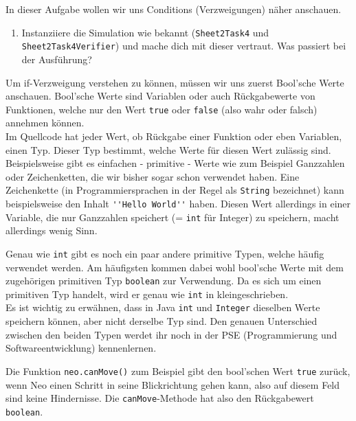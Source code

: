 

In dieser Aufgabe wollen wir uns Conditions (Verzweigungen) näher anschauen.

\begin{enumerate}                           
    \item Instanziiere die Simulation wie bekannt (\lstinline{Sheet2Task4} und \lstinline{Sheet2Task4Verifier}) und mache dich mit dieser vertraut.
        Was passiert bei der Ausführung?
\end{enumerate}

\begin{Infobox}
    Um if-Verzweigung verstehen zu können, müssen wir uns zuerst Bool'sche Werte anschauen. Bool'sche Werte sind Variablen oder auch Rückgabewerte von Funktionen, welche nur den Wert \lstinline{true} oder \lstinline{false} (also wahr oder falsch) annehmen können. \\
Im Quellcode hat jeder Wert, ob Rückgabe einer Funktion oder eben Variablen, einen Typ.
Dieser Typ bestimmt, welche Werte für diesen Wert zulässig sind.
Beispielsweise gibt es einfachen - primitive - Werte wie zum Beispiel Ganzzahlen oder Zeichenketten, die wir bisher sogar schon verwendet haben.
Eine Zeichenkette (in Programmiersprachen in der Regel als \lstinline{String} bezeichnet) kann beispielsweise den Inhalt \lstinline{''Hello World''} haben.
Diesen Wert allerdings in einer Variable, die nur Ganzzahlen speichert (= \lstinline{int} für Integer) zu speichern, macht allerdings wenig Sinn.

Genau wie \lstinline{int} gibt es noch ein paar andere primitive Typen, welche häufig verwendet werden.
Am häufigsten kommen dabei wohl bool'sche Werte mit dem zugehörigen primitiven Typ \lstinline{boolean} zur Verwendung.
Da es sich um einen primitiven Typ handelt, wird er genau wie \lstinline{int} in kleingeschrieben.\\

Es ist wichtig zu erwähnen, dass in Java \lstinline{int} und \lstinline{Integer} dieselben Werte speichern können, aber nicht derselbe Typ sind.
Den genauen Unterschied zwischen den beiden Typen werdet ihr noch in der PSE (Programmierung und Softwareentwicklung) kennenlernen.

Die Funktion \lstinline{neo.canMove()} zum Beispiel gibt den bool'schen Wert \lstinline{true} zurück, wenn Neo einen Schritt in seine Blickrichtung gehen kann, also auf diesem Feld sind keine Hindernisse.
Die \lstinline{canMove}-Methode hat also den Rückgabewert \lstinline{boolean}.
    
\end{Infobox}

